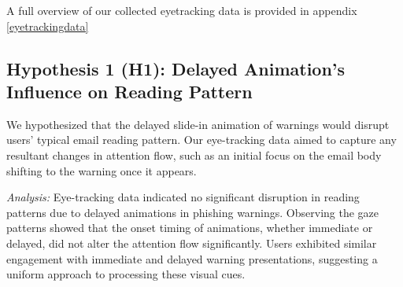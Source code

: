 \documentclass[
  a4paper,  %
  twoside,  %
  bibliography=totoc,
  headsepline,
  cleardoublepage=empty,
  parskip=half,
  draft=false
]{scrbook}
\begin{document}
A full overview of our collected eyetracking data is provided in appendix \ref{eyetrackingdata}


\subsection{Hypothesis 1 (H1): Delayed Animation's Influence on Reading Pattern}
We hypothesized that the delayed slide-in animation of warnings would disrupt users' typical email reading pattern. Our eye-tracking data aimed to capture any resultant changes in attention flow, such as an initial focus on the email body shifting to the warning once it appears. \par
\textit{Analysis:} Eye-tracking data indicated no significant disruption in reading patterns due to delayed animations in phishing warnings. Observing the gaze patterns showed that the onset timing of animations, whether immediate or delayed, did not alter the attention flow significantly. Users exhibited similar engagement with immediate and delayed warning presentations, suggesting a uniform approach to processing these visual cues.
\end{document}
